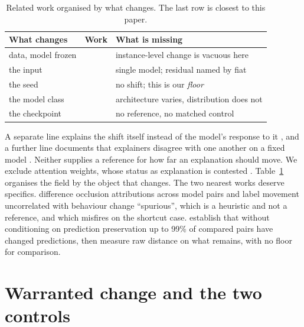 \documentclass{article}
\begin{document}
\begin{table}[t]
\caption{Related work organised by what changes. The last row is closest to this paper.}
\label{tab:related}
\centering\small
\begin{tabular}{@{}p{}p{}p{}@{}}
\toprule
\textbf{What changes} & \textbf{Work} & \textbf{What is missing} \\
\midrule
data, model frozen & \citet{mougan2025} & instance-level change is vacuous here \\
the input & \citet{fass2026,ghorbani2019} & single model; residual named by fiat \\
the seed & \citet{evoxplain2025,laberge2023} & no shift; this is our \emph{floor} \\
the model class & \citet{hypclass2026} & architecture varies, distribution does not \\
the checkpoint & \citet{deltaaudit2025,rsp2026,xray2026} & no reference, no matched control \\
\bottomrule
\end{tabular}
\end{table}

A separate line explains the shift itself instead of the model's response to it
\citep{kulinski2023,hinder2022}, and a further line documents that explainers disagree with one
another on a fixed model \citep{krishna2022}. Neither supplies a reference for how far an
explanation should move. We exclude attention weights, whose status as explanation is contested
\citep{jain2019}. Table~\ref{tab:related} organises the field by the object that changes. The two nearest works deserve
specifics. \citet{deltaaudit2025} difference occlusion attributions across model pairs and label
movement uncorrelated with behaviour change ``spurious'', which is a heuristic and not a
reference, and which misfires on the shortcut case. \citet{fass2026} establish that without
conditioning on prediction preservation up to 99\% of compared pairs have changed predictions, then
measure raw distance on what remains, with no floor for comparison.

\section{Warranted change and the two controls}
\label{sec:warranted}
\end{document}
